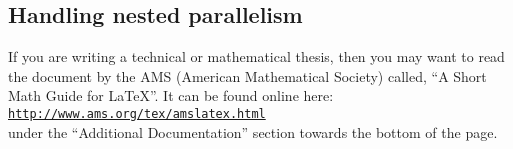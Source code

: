 \subsection{Handling nested parallelism}

If you are writing a technical or mathematical thesis, then you may want to read the document by the AMS (American Mathematical Society) called, ``A Short Math Guide for \LaTeX{}''. It can be found online here:\\
\href{http://www.ams.org/tex/amslatex.html}{\texttt{http://www.ams.org/tex/amslatex.html}}\\
under the ``Additional Documentation'' section towards the bottom of the page.
